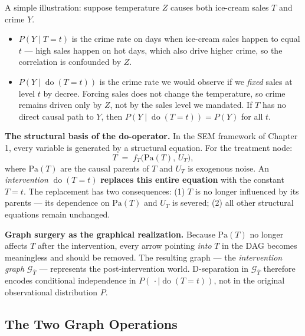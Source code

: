 \documentclass[
  a4paper,
]{book}
\providecommand{\tightlist}{%
  \setlength{\itemsep}{0pt}\setlength{\parskip}{0pt}}
\newcommand{\doop}{\operatorname{do}}
\newcommand{\Gcal}{\mathcal{G}}
\newcommand{\Pa}{\mathrm{Pa}}
\begin{document}
A simple illustration: suppose temperature \(Z\) causes both ice-cream
sales \(T\) and crime \(Y\).

\begin{itemize}
\tightlist
\item
  \(P(Y \mid T{=}t)\) is the crime rate on days when ice-cream sales
  happen to equal \(t\) --- high sales happen on hot days, which also
  drive higher crime, so the correlation is confounded by \(Z\).
\item
  \(P(Y \mid \doop(T{=}t))\) is the crime rate we would observe if we
  \emph{fixed} sales at level \(t\) by decree. Forcing sales does not
  change the temperature, so crime remains driven only by \(Z\), not by
  the sales level we mandated. If \(T\) has no direct causal path to
  \(Y\), then \(P(Y \mid \doop(T{=}t)) = P(Y)\) for all \(t\).
\end{itemize}

\textbf{The structural basis of the do-operator.} In the SEM framework
of Chapter 1, every variable is generated by a structural equation. For
the treatment node: \[T \;=\; f_T\!\bigl(\Pa(T),\, U_T\bigr),\] where
\(\Pa(T)\) are the causal parents of \(T\) and \(U_T\) is exogenous
noise. An \emph{intervention} \(\doop(T{=}t)\) \textbf{replaces this
entire equation} with the constant \(T = t\). The replacement has two
consequences: (1) \(T\) is no longer influenced by its parents --- its
dependence on \(\Pa(T)\) and \(U_T\) is severed; (2) all other
structural equations remain unchanged.

\textbf{Graph surgery as the graphical realization.} Because \(\Pa(T)\)
no longer affects \(T\) after the intervention, every arrow pointing
\emph{into} \(T\) in the DAG becomes meaningless and should be removed.
The resulting graph --- the \emph{intervention graph}
\(\Gcal_{\overline{T}}\) --- represents the post-intervention world.
D-separation in \(\Gcal_{\overline{T}}\) therefore encodes conditional
independence in \(P(\,\cdot \mid \doop(T{=}t))\), not in the original
observational distribution \(P\).

\subsection{The Two Graph Operations}\label{sec-operations}
\end{document}
